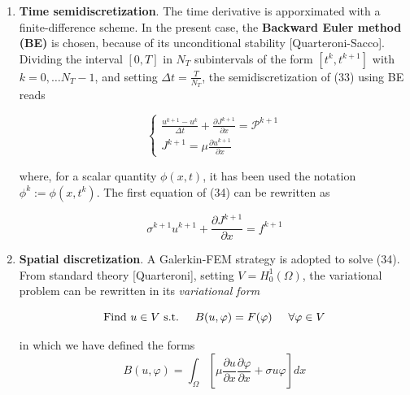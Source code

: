 \documentclass[a4paper]{article}
\begin{document}
\begin{enumerate}
	\item \textbf{Time semidiscretization}. The time derivative is apporximated with a finite-difference scheme. In the present case, the \textbf{Backward Euler method (BE)} is chosen, because of its unconditional stability [Quarteroni-Sacco]. Dividing the interval $[0,T]$ in $N_T$ subintervals of the form $[t^k, t^{k+1}]$ with $ k=0, \dots N_T-1$, and setting $\Delta t = \frac{T}{N_T} $, the semidiscretization of (33) using BE reads
	
	\begin{equation}
	\begin{cases}
	\frac{u^{k+1} - u^k}{\Delta t} +\frac{\partial J^{k+1}}{\partial x} = \mathcal{P}^{k+1}  \\
	J^{k+1} =  \mu \frac{\partial u^{k+1}}{\partial x} 
	\end{cases}
	\end{equation}
	 
	where, for a scalar quantity $\phi(x,t)$, it has been used the notation $ \phi^k := \phi(x,t^k) $. The first equation of (34) can be rewritten as
	
	\begin{equation}
	\sigma ^{k+1} u^{k+1} +\frac{\partial J^{k+1}}{\partial x} = f^{k+1} 
	\end{equation}
	
	\item \textbf{Spatial discretization}. A Galerkin-FEM strategy is adopted to solve (34). From standard theory [Quarteroni], setting $V = H_0^1(\Omega)$, the variational problem can be rewritten in its \textit{variational form}
	
	\begin{equation}
	\text{Find $u \in V$ s.t.} \hspace{0.5cm} B(u,\varphi) = F(\varphi) \hspace{0.5cm} \forall \varphi \in V
	\end{equation}
	
	in which we have defined the forms
	\begin{equation}
	B(u,\varphi) = \int_{\Omega}\left[\mu \frac{\partial u}{\partial x}  \frac{\partial \varphi}{\partial x} + \sigma u \varphi \right]  dx
	\end{equation}
	

\end{enumerate}
\end{document}
